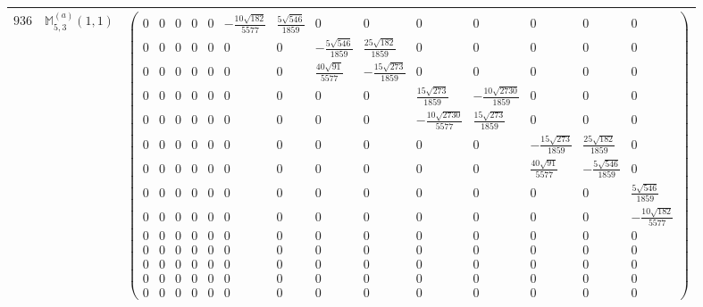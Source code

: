 \documentclass[fleqn,8pt,landscape]{jsarticle}
\begin{document}
\begin{center}
\begin{longtable}{ccc}
$ 936 $ & $ \mathbb{M}_{5,3}^{(a)}(1,1) $ & $ \begin{pmatrix} 0 & 0 & 0 & 0 & 0 & - \frac{10 \sqrt{182}}{5577} & \frac{5 \sqrt{546}}{1859} & 0 & 0 & 0 & 0 & 0 & 0 & 0 \\ 0 & 0 & 0 & 0 & 0 & 0 & 0 & - \frac{5 \sqrt{546}}{1859} & \frac{25 \sqrt{182}}{1859} & 0 & 0 & 0 & 0 & 0 \\ 0 & 0 & 0 & 0 & 0 & 0 & 0 & \frac{40 \sqrt{91}}{5577} & - \frac{15 \sqrt{273}}{1859} & 0 & 0 & 0 & 0 & 0 \\ 0 & 0 & 0 & 0 & 0 & 0 & 0 & 0 & 0 & \frac{15 \sqrt{273}}{1859} & - \frac{10 \sqrt{2730}}{1859} & 0 & 0 & 0 \\ 0 & 0 & 0 & 0 & 0 & 0 & 0 & 0 & 0 & - \frac{10 \sqrt{2730}}{5577} & \frac{15 \sqrt{273}}{1859} & 0 & 0 & 0 \\ 0 & 0 & 0 & 0 & 0 & 0 & 0 & 0 & 0 & 0 & 0 & - \frac{15 \sqrt{273}}{1859} & \frac{25 \sqrt{182}}{1859} & 0 \\ 0 & 0 & 0 & 0 & 0 & 0 & 0 & 0 & 0 & 0 & 0 & \frac{40 \sqrt{91}}{5577} & - \frac{5 \sqrt{546}}{1859} & 0 \\ 0 & 0 & 0 & 0 & 0 & 0 & 0 & 0 & 0 & 0 & 0 & 0 & 0 & \frac{5 \sqrt{546}}{1859} \\ 0 & 0 & 0 & 0 & 0 & 0 & 0 & 0 & 0 & 0 & 0 & 0 & 0 & - \frac{10 \sqrt{182}}{5577} \\ 0 & 0 & 0 & 0 & 0 & 0 & 0 & 0 & 0 & 0 & 0 & 0 & 0 & 0 \\ 0 & 0 & 0 & 0 & 0 & 0 & 0 & 0 & 0 & 0 & 0 & 0 & 0 & 0 \\ 0 & 0 & 0 & 0 & 0 & 0 & 0 & 0 & 0 & 0 & 0 & 0 & 0 & 0 \\ 0 & 0 & 0 & 0 & 0 & 0 & 0 & 0 & 0 & 0 & 0 & 0 & 0 & 0 \\ 0 & 0 & 0 & 0 & 0 & 0 & 0 & 0 & 0 & 0 & 0 & 0 & 0 & 0 \end{pmatrix} $ \\ \hline

\end{longtable}
\end{center}
\end{document}
